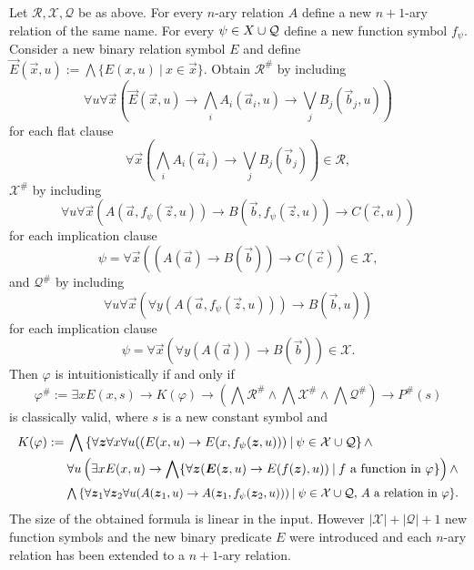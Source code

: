\documentclass[runningheads]{llncs}
\begin{document}
\begin{theorem}\label{thm:fo-translation}
	Let $\mathcal R,\mathcal X,\mathcal Q$ be as above. For every $n$-ary relation $A$ define a new $n+1$-ary relation of the same name. For every $\psi\in\mathcal \mathcal X\cup\mathcal Q$ define a new function symbol $f_\psi$. Consider a new binary relation symbol $E$ and define $\vec E(\vec x, u) := \bigwedge\{E(x, u)\:|\:x\in\vec x\}$. Obtain $\mathcal R^\#$ by including
	$$
		\forall u\forall \vec x\left(\vec E(\vec x, u)\to\bigwedge_i A_i(\vec a_i, u)\to\bigvee_j B_j(\vec b_j, u)\right)
	$$
 	for each flat clause
 	$$
 		\forall \vec x\left(\bigwedge_i A_i(\vec a_i)\to\bigvee_j B_j(\vec b_j)\right)\in\mathcal R,
 	$$
 	$\mathcal X^\#$ by including
 	$$
 		\forall u\forall \vec x\left(A(\vec a, f_\psi(\vec z, u))\to B(\vec b, f_\psi(\vec z, u))\to C(\vec c, u)\right)
 	$$
 	for each implication clause
	$$
		\psi = \forall \vec x\left(\left(A(\vec a)\to B(\vec b)\right)\to C(\vec c)\right)\in\mathcal X,
	$$
	and $\mathcal Q^\#$ by including
	$$
		\forall u\forall \vec x\left(\forall y\left(A(\vec a, f_\psi(\vec z, u))\right)\to B(\vec b, u)\right)
	$$
	for each implication clause
	$$
		\psi = \forall \vec x\left(\forall y\left(A(\vec a)\right)\to B(\vec b)\right)\in\mathcal X.
	$$
	Then $\varphi$ is intuitionistically if and only if
	$$
		\varphi^\# := \exists xE(x, s)\to K(\varphi)\to \left(\bigwedge\mathcal R^\#\wedge\bigwedge\mathcal X^\#\wedge\bigwedge\mathcal Q^\#\right)\to P^\#(s)
	$$
	is classically valid, where $s$ is a new constant symbol and
	\begin{align*}
		K(\varphi) := &\:\bigwedge\left\{\forall\vec z\forall x\forall u((E(x, u)\to E(x, f_\psi(\vec z, u)))\:|\:\psi\in\mathcal X\cup\mathcal Q\right\}\wedge\\
		&\:\forall u\left(\exists xE(x, u)\to \bigwedge\{\forall\vec z(\vec E(\vec z, u)\to E(f(\vec z), u))\:|\:\text{$f$ a function in $\varphi$}\}\right)\wedge\\
		&\resizebox{.9\hsize}{!}{$\:\bigwedge\left\{\forall\vec z_1\forall \vec z_2\forall u(A(\vec z_1, u)\to A(\vec z_1, f_\psi(\vec z_2, u)))\:|\:\text{$\psi\in\mathcal X\cup\mathcal Q$, $A$ a relation in $\varphi$}\right\}$.}
	\end{align*}
	The size of the obtained formula is linear in the input. However $|\mathcal X| + |\mathcal Q| + 1$ new function symbols and the new binary predicate $E$ were introduced and each $n$-ary relation has been extended to a $n+1$-ary relation.
\end{theorem}
\end{document}
